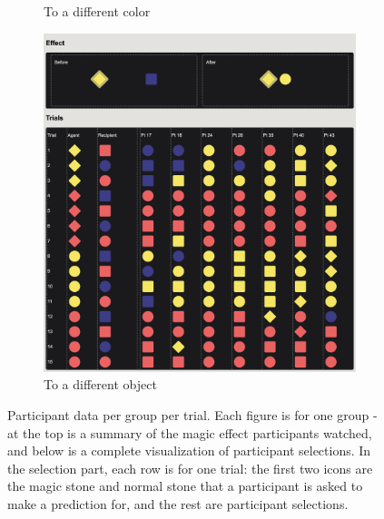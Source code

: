 \documentclass{article}
\begin{document}
\begin{figure}[h!]
\begin{subfigure}[t]{0.31\textwidth}
  	\caption{To a different color} \label{fig:raw_g4}
  \end{subfigure}
  \hfill
  \begin{subfigure}[t]{0.31\textwidth}
  	\centering
  	\includegraphics[width=\linewidth]{raw_g5} 
  	\caption{To a different object} \label{fig:raw_g5}
  \end{subfigure}
  \caption{Participant data per group per trial. Each figure is for one group - at the top is a summary of the magic effect participants watched, and below is a complete visualization of participant selections. In the selection part, each row is for one trial: the first two icons are the magic stone and normal stone that a participant is asked to make a prediction for, and the rest are participant selections.}
\end{figure}
\end{document}
